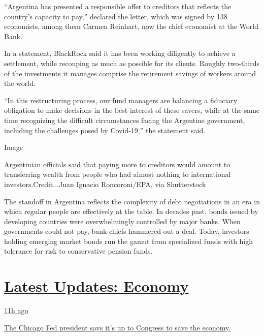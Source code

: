 ``Argentina has presented a responsible offer to creditors that reflects
the country's capacity to pay,'' declared the letter, which was signed
by 138 economists, among them Carmen Reinhart, now the chief economist
at the World Bank.

In a statement, BlackRock said it has been working diligently to achieve
a settlement, while recouping as much as possible for its clients.
Roughly two-thirds of the investments it manages comprise the retirement
savings of workers around the world.

``In this restructuring process, our fund managers are balancing a
fiduciary obligation to make decisions in the best interest of these
savers, while at the same time recognizing the difficult circumstances
facing the Argentine government, including the challenges posed by
Covid-19,'' the statement said.

Image

Argentinian officials said that paying more to creditors would amount to
transferring wealth from people who had almost nothing to international
investors.Credit...Juan Ignacio Roncoroni/EPA, via Shutterstock

The standoff in Argentina reflects the complexity of debt negotiations
in an era in which regular people are effectively at the table. In
decades past, bonds issued by developing countries were overwhelmingly
controlled by major banks. When governments could not pay, bank chiefs
hammered out a deal. Today, investors holding emerging market bonds run
the gamut from specialized funds with high tolerance for risk to
conservative pension funds.

\hypertarget{latest-updates-economy}{%
\section{\texorpdfstring{\href{https://www.nytimes.com/live/2020/08/03/business/stock-market-today-coronavirus?action=click\&pgtype=Article\&state=default\&region=MAIN_CONTENT_1\&context=storylines_live_updates}{Latest
Updates:
Economy}}{Latest Updates: Economy}}\label{latest-updates-economy}}

\href{https://www.nytimes.com/live/2020/08/03/business/stock-market-today-coronavirus?action=click\&pgtype=Article\&state=default\&region=MAIN_CONTENT_1\&context=storylines_live_updates\#the-chicago-fed-president-says-its-up-to-congress-to-save-the-economy}{11h
ago}

\href{https://www.nytimes.com/live/2020/08/03/business/stock-market-today-coronavirus?action=click\&pgtype=Article\&state=default\&region=MAIN_CONTENT_1\&context=storylines_live_updates\#the-chicago-fed-president-says-its-up-to-congress-to-save-the-economy}{The
Chicago Fed president says it's up to Congress to save the economy.}

